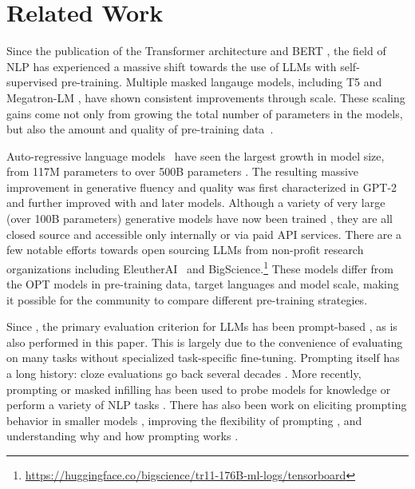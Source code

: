 \section{Related Work}
\label{sec:related_work}

Since the publication of the Transformer architecture \cite{vaswani2017attention} and BERT \cite{devlin2018bert}, the field of NLP has experienced a massive shift towards the use of LLMs with self-supervised pre-training. 
Multiple masked langauge models, including T5 \cite{raffel2020exploring} and Megatron-LM \cite{shoeybi2019megatron}, have shown consistent improvements through scale. These scaling gains come not only from growing the total number of parameters in the models, but also the amount and quality of pre-training data~\cite{liu2019roberta,chinchilla2022}.  

Auto-regressive language models~\cite{mikolov2009neural} have seen the largest growth in model size, from 117M parameters \cite{radford2018gpt} to over 500B parameters \cite{megatron2022,palm2022}. The resulting massive improvement in generative fluency and quality was first characterized in GPT-2 \cite{radford2019language} and further improved with \biggpt{} \cite{brown2020gpt3} and later models. Although a variety of very large (over 100B parameters) generative models have now been trained \cite{J1WhitePaper,gopher2022,thoppilan2022lamda,megatron2022,palm2022}, they are all closed source and accessible only internally or via paid API services. There are a few notable efforts towards open sourcing LLMs from non-profit research organizations including EleutherAI~\cite{eleutherai2022} and BigScience.\footnote{\url{https://huggingface.co/bigscience/tr11-176B-ml-logs/tensorboard}} These models differ from the OPT models in pre-training data, target languages and model scale, making it possible for the community to compare different pre-training strategies.


Since \citet{brown2020gpt3}, the primary evaluation criterion for LLMs has been prompt-based \cite{eleutherai2022,gopher2022,palm2022}, as is also performed in this paper. This is largely due to the convenience of evaluating on many tasks without specialized task-specific fine-tuning. Prompting itself has a long history: cloze evaluations go back several decades \cite{chambers-jurafsky-2008-unsupervised,storycloze}. More recently, prompting or masked infilling has been used to probe models for knowledge \cite{petroni2019language} or perform a variety of NLP tasks \cite{radford2019language, brown2020gpt3}.
There has also been work on eliciting prompting behavior in smaller models \cite{timopriming2020,gao2021,Li2021Prefix-Tuning:Generation,DBLP:journals/corr/abs-2104-08691,Scao2021HowWorth}, improving the flexibility of prompting \cite{Shin2020AutoPrompt}, and understanding why and how prompting works \cite{incontextgpt3_2021,min2022rethinking}. 

